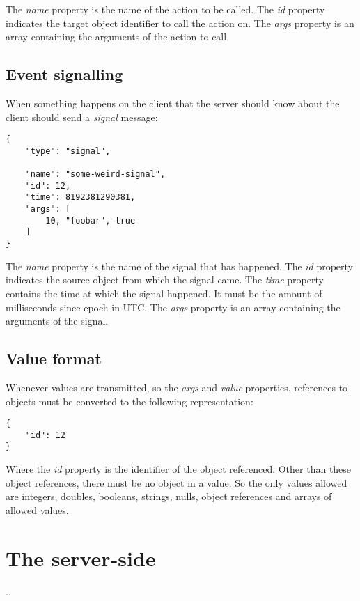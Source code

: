 \documentclass[11pt]{article}
\begin{document}
The \textit{name} property is the name of the action to be called.
The \textit{id} property indicates the target object identifier to call the action on.
The \textit{args} property is an array containing the arguments of the action to call.

\subsection{Event signalling}

When something happens on the client that the server should know about the client should send a \textit{signal} message:

\begin{verbatim}
{
    "type": "signal",

    "name": "some-weird-signal",
    "id": 12,
    "time": 8192381290381,
    "args": [
        10, "foobar", true
    ]
}
\end{verbatim}

The \textit{name} property is the name of the signal that has happened.
The \textit{id} property indicates the source object from which the signal came.
The \textit{time} property contains the time at which the signal happened.
It must be the amount of milliseconds since epoch in UTC.
The \textit{args} property is an array containing the arguments of the signal.

\subsection{Value format}

Whenever values are transmitted, so the \textit{args} and \textit{value} properties, references to objects must be converted to the following representation:

\begin{verbatim}
{
    "id": 12
}
\end{verbatim}

Where the \textit{id} property is the identifier of the object referenced.
Other than these object references, there must be no object in a value.
So the only values allowed are integers, doubles, booleans, strings, nulls, object references and arrays of allowed values.

\newpage
\section{The server-side}

..


\end{document}
